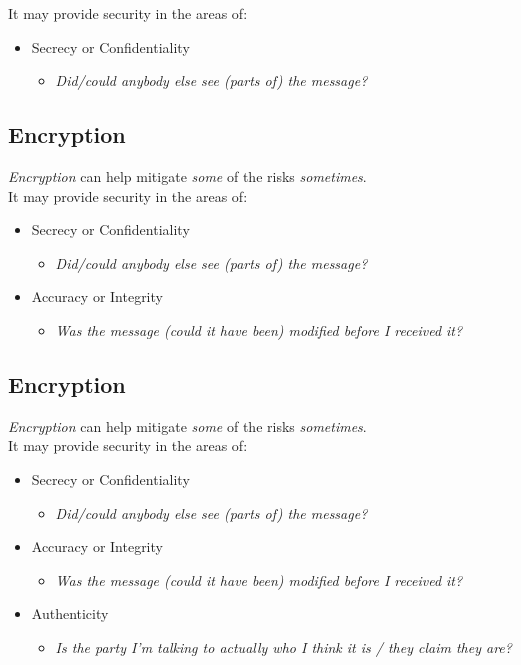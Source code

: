 \documentclass[xga]{xdvislides}
\begin{document}
It may provide security in the areas of:
\begin{itemize}
	\item Secrecy or Confidentiality
		\begin{itemize}
			\item {\em Did/could anybody else see (parts of) the message?}
		\end{itemize}
\end{itemize}

\subsection{Encryption}
{\em Encryption} can help mitigate {\em some} of the risks {\em sometimes}.
\\

It may provide security in the areas of:
\begin{itemize}
	\item Secrecy or Confidentiality
		\begin{itemize}
			\item {\em Did/could anybody else see (parts of) the message?}
		\end{itemize}
	\item Accuracy or Integrity
		\begin{itemize}
			\item {\em Was the message (could it have been) modified before I received it?}
		\end{itemize}
\end{itemize}

\subsection{Encryption}
{\em Encryption} can help mitigate {\em some} of the risks {\em sometimes}.
\\

It may provide security in the areas of:
\begin{itemize}
	\item Secrecy or Confidentiality
		\begin{itemize}
			\item {\em Did/could anybody else see (parts of) the message?}
		\end{itemize}
	\item Accuracy or Integrity
		\begin{itemize}
			\item {\em Was the message (could it have been) modified before I received it?}
		\end{itemize}
	\item Authenticity
		\begin{itemize}
			\item {\em Is the party I'm talking to actually
who I think it is / they claim they are?}
		\end{itemize}
\end{itemize}
\end{document}
